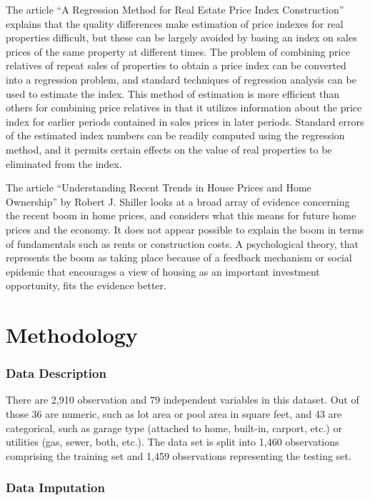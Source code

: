 \documentclass[
]{article}
\begin{document}
The article ``A Regression Method for Real Estate Price Index
Construction'' explains that the quality differences make estimation of
price indexes for real properties difficult, but these can be largely
avoided by basing an index on sales prices of the same property at
different times. The problem of combining price relatives of repeat
sales of properties to obtain a price index can be converted into a
regression problem, and standard techniques of regression analysis can
be used to estimate the index. This method of estimation is more
efficient than others for combining price relatives in that it utilizes
information about the price index for earlier periods contained in sales
prices in later periods. Standard errors of the estimated index numbers
can be readily computed using the regression method, and it permits
certain effects on the value of real properties to be eliminated from
the index.

The article ``Understanding Recent Trends in House Prices and Home
Ownership'' by Robert J. Shiller looks at a broad array of evidence
concerning the recent boom in home prices, and considers what this means
for future home prices and the economy. It does not appear possible to
explain the boom in terms of fundamentals such as rents or construction
costs. A psychological theory, that represents the boom as taking place
because of a feedback mechanism or social epidemic that encourages a
view of housing as an important investment opportunity, fits the
evidence better.

\hypertarget{methodology}{%
\section{Methodology}\label{methodology}}

\hypertarget{data-description}{%
\subsubsection{Data Description}\label{data-description}}

There are 2,910 observation and 79 independent variables in this
dataset. Out of those 36 are numeric, such as lot area or pool area in
square feet, and 43 are categorical, such as garage type (attached to
home, built-in, carport, etc.) or utilities (gas, sewer, both, etc.).
The data set is split into 1,460 observations comprising the training
set and 1,459 observations representing the testing set.

\hypertarget{data-imputation}{%
\subsubsection{Data Imputation}\label{data-imputation}}
\end{document}
